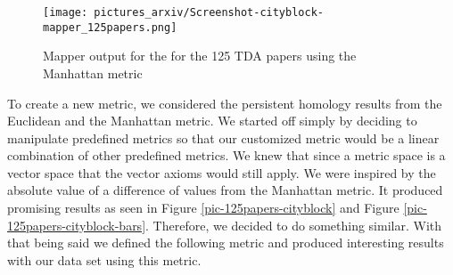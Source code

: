 \documentclass[12pt]{article}
\theoremstyle{definition}
\begin{document}
\begin{figure}[h]
\texttt{[image: pictures\_arxiv/Screenshot-cityblock-mapper\_125papers.png]}
\caption{Mapper output for the for the 125 TDA papers using the Manhattan metric}
\label{pic-125papers-cityblock-mapper}
\end{figure}

\par To create a new metric, we considered the persistent homology results from the Euclidean and the Manhattan metric. We started off simply by deciding to manipulate predefined metrics so that our customized metric would be a linear combination of other predefined metrics. We knew that since a metric space is a vector space that the vector axioms would still apply. We were inspired by the absolute value of a difference of values from the Manhattan metric. It produced promising results as seen in Figure \ref{pic-125papers-cityblock} and Figure \ref{pic-125papers-cityblock-bars}. Therefore, we decided to do something similar. With that being said we defined the following metric and produced interesting results with our data set using this metric. 
\newline
\end{document}
